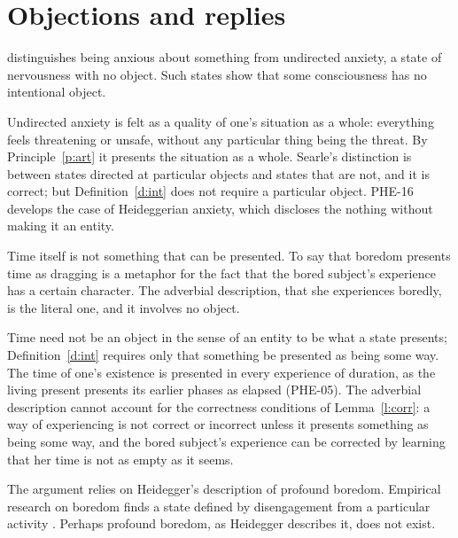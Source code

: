 \documentclass{situationist-preprint}
\begin{document}
\section{Objections and replies}

\begin{objection}
\citet{Searle1983} distinguishes being anxious about something from undirected anxiety, a state of nervousness with no object. Such states show that some consciousness has no intentional object.
\end{objection}

\begin{reply}
Undirected anxiety is felt as a quality of one's situation as a whole: everything feels threatening or unsafe, without any particular thing being the threat. By Principle~\ref{p:art} it presents the situation as a whole. Searle's distinction is between states directed at particular objects and states that are not, and it is correct; but Definition~\ref{d:int} does not require a particular object. PHE-16 develops the case of Heideggerian anxiety, which discloses the nothing without making it an entity.
\end{reply}

\begin{objection}
Time itself is not something that can be presented. To say that boredom presents time as dragging is a metaphor for the fact that the bored subject's experience has a certain character. The adverbial description, that she experiences boredly, is the literal one, and it involves no object.
\end{objection}

\begin{reply}
Time need not be an object in the sense of an entity to be what a state presents; Definition~\ref{d:int} requires only that something be presented as being some way. The time of one's existence is presented in every experience of duration, as the living present presents its earlier phases as elapsed (PHE-05). The adverbial description cannot account for the correctness conditions of Lemma~\ref{l:corr}: a way of experiencing is not correct or incorrect unless it presents something as being some way, and the bored subject's experience can be corrected by learning that her time is not as empty as it seems.
\end{reply}

\begin{objection}
The argument relies on Heidegger's description of profound boredom. Empirical research on boredom finds a state defined by disengagement from a particular activity \citep{EastwoodEtAl2012}. Perhaps profound boredom, as Heidegger describes it, does not exist.
\end{objection}
\end{document}
